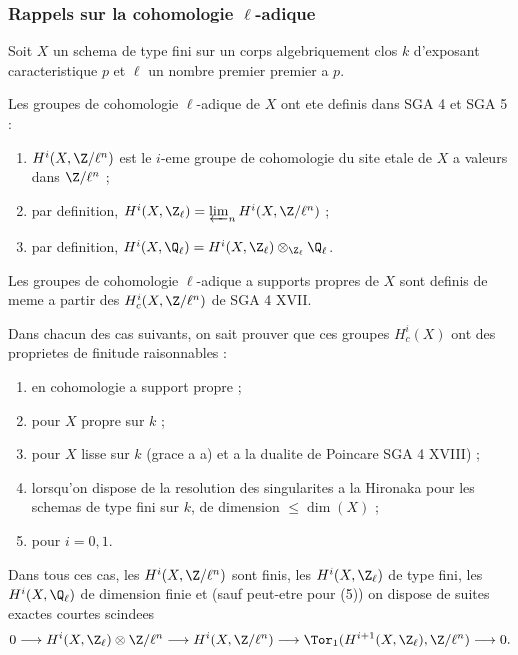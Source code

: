 \subsubsection{Rappels sur la cohomologie $\ell$-adique}
\label{subsubsec:rappels-cohomologie}

Soit $X$ un schema de type fini sur un corps algebriquement clos $k$ d'exposant caracteristique $p$ et $\ell$ un nombre premier premier a $p$.

Les groupes de cohomologie $\ell$-adique de $X$ ont ete definis dans SGA 4 et SGA 5 :

\begin{enumerate}[label=\alph*)]
\item $H^i(X, \Z/\ell^n)$ est le $i$-eme groupe de cohomologie du site etale de $X$ a valeurs dans $\Z/\ell^n$ ;
\item par definition, $H^i(X, \Z_\ell) = \varprojlim_n H^i(X, \Z/\ell^n)$ ;
\item par definition, $H^i(X, \Q_\ell) = H^i(X, \Z_\ell) \otimes_{\Z_\ell} \Q_\ell$.
\end{enumerate}

Les groupes de cohomologie $\ell$-adique a supports propres de $X$ sont definis de meme a partir des $H^i_c(X, \Z/\ell^n)$ de SGA 4 XVII.

Dans chacun des cas suivants, on sait prouver que ces groupes $H^i_c(X)$ ont des proprietes de finitude raisonnables :

\begin{enumerate}[label=(\arabic*)]
\item en cohomologie a support propre ;
\item pour $X$ propre sur $k$ ;
\item pour $X$ lisse sur $k$ (grace a a) et a la dualite de Poincare SGA 4 XVIII) ;
\item lorsqu'on dispose de la resolution des singularites a la Hironaka pour les schemas de type fini sur $k$, de dimension $\leqslant \dim(X)$ ;
\item pour $i = 0, 1$.
\end{enumerate}

Dans tous ces cas, les $H^i(X, \Z/\ell^n)$ sont finis, les $H^i(X, \Z_\ell)$ de type fini, les $H^i(X, \Q_\ell)$ de dimension finie et (sauf peut-etre pour (5)) on dispose de suites exactes courtes scindees
\[
0 \longrightarrow H^i(X, \Z_\ell) \otimes \Z/\ell^n \longrightarrow H^i(X, \Z/\ell^n) \longrightarrow \Tor_1(H^{i+1}(X, \Z_\ell), \Z/\ell^n) \longrightarrow 0 .
\]

